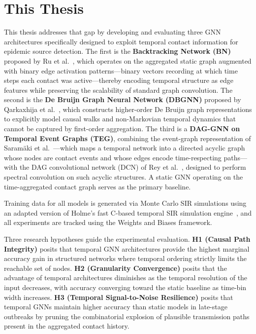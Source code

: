 \section{This Thesis}
\label{sec:intro-thesis}

This thesis addresses that gap by developing and evaluating three GNN architectures specifically designed to exploit temporal contact information for epidemic source detection. The first is the \textbf{Backtracking Network (BN)} proposed by Ru et al.~\cite{Ru2023}, which operates on the aggregated static graph augmented with binary edge activation patterns---binary vectors recording at which time steps each contact was active---thereby encoding temporal structure as edge features while preserving the scalability of standard graph convolution. The second is the \textbf{De Bruijn Graph Neural Network (DBGNN)} proposed by Qarkaxhija et al.~\cite{Qarkaxhija2022}, which constructs higher-order De Bruijn graph representations to explicitly model causal walks and non-Markovian temporal dynamics that cannot be captured by first-order aggregation. The third is a \textbf{DAG-GNN on Temporal Event Graphs (TEG)}, combining the event-graph representation of Saram\"aki et al.~\cite{Saramaki2019}---which maps a temporal network into a directed acyclic graph whose nodes are contact events and whose edges encode time-respecting paths---with the DAG convolutional network (DCN) of Rey et al.~\cite{Rey2025}, designed to perform spectral convolution on such acyclic structures. A static GNN operating on the time-aggregated contact graph serves as the primary baseline.

Training data for all models is generated via Monte Carlo SIR simulations using an adapted version of Holme's fast C-based temporal SIR simulation engine~\cite{Holme2020}, and all experiments are tracked using the Weights and Biases framework.

Three research hypotheses guide the experimental evaluation. \textbf{H1 (Causal Path Integrity)} posits that temporal GNN architectures provide the highest marginal accuracy gain in structured networks where temporal ordering strictly limits the reachable set of nodes. \textbf{H2 (Granularity Convergence)} posits that the advantage of temporal architectures diminishes as the temporal resolution of the input decreases, with accuracy converging toward the static baseline as time-bin width increases. \textbf{H3 (Temporal Signal-to-Noise Resilience)} posits that temporal GNNs maintain higher accuracy than static models in late-stage outbreaks by pruning the combinatorial explosion of plausible transmission paths present in the aggregated contact history.

